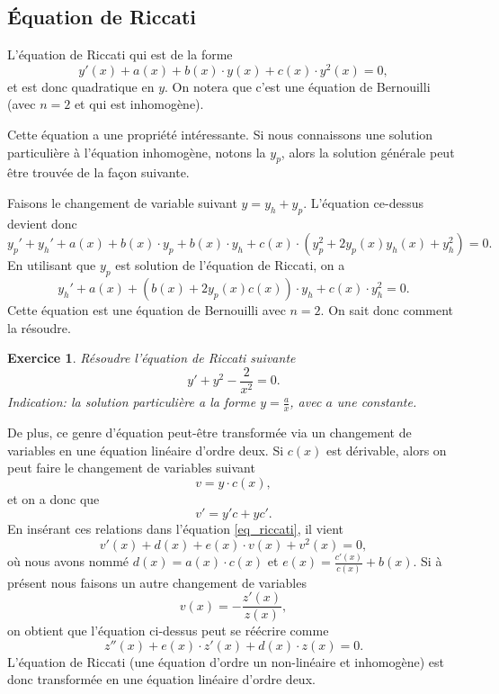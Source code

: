 \documentclass[a4paper,12pt]{book}
\renewcommand{\eqref}[1]{\ref{#1}}
\newtheorem*{exercice}{Exercice}
\begin{document}
\subsection{Équation de Riccati}

L'équation de Riccati qui est de la forme
\begin{equation}
 y'(x)+a(x)+b(x)\cdot y(x)+c(x)\cdot y^2(x)=0,\label{eq_riccati}
\end{equation}
et est donc quadratique en $y$. On notera que c'est une équation de Bernouilli (avec $n=2$ et qui est inhomogène).

Cette équation a une propriété intéressante. Si nous connaissons une solution particulière 
à l'équation inhomogène, notons la $y_p$, alors la solution générale peut être trouvée de la façon suivante.

Faisons le changement de variable suivant $y=y_h+y_p$. L'équation ce-dessus devient donc
\begin{equation}
 y_p'+y_h'+a(x)+b(x)\cdot y_p+b(x)\cdot y_h+c(x)\cdot (y_p^2+2y_p(x)y_h(x)+y_h^2)=0.
\end{equation}
En utilisant que $y_p$ est solution de l'équation de Riccati, on a
\begin{equation}
 y_h'+a(x)+(b(x)+2y_p(x)c(x))\cdot y_h+c(x)\cdot y_h^2=0.
\end{equation}
Cette équation est une équation de Bernouilli avec $n=2$. On sait donc comment la résoudre. 

\begin{exercice}
 Résoudre l'équation de Riccati suivante
 \begin{equation}
 y'+y^2-\frac{2}{x^2}=0.
 \end{equation}
Indication: la solution particulière a la forme $y=\frac{a}{x}$, avec $a$ une constante.
\end{exercice}


De plus, ce genre d'équation peut-être transformée via un changement de variables en une équation 
linéaire d'ordre deux. Si $c(x)$ est dérivable, alors on peut faire le changement de variables suivant
\begin{equation}
v=y\cdot c(x),
\end{equation}
et on a donc que 
\begin{equation}
v'=y' c+y c'.
\end{equation}
En insérant ces relations dans l'équation \eqref{eq_riccati}, il vient
\begin{equation}
 v'(x)+d(x)+e(x)\cdot v(x)+v^2(x)=0,\label{eq_riccati_2}
\end{equation}
où nous avons nommé $d(x)=a(x)\cdot c(x)$ et $e(x)=\frac{c'(x)}{c(x)}+b(x)$. Si à présent nous faisons
un autre changement de variables 
\begin{equation}
 v(x)=-\frac{z'(x)}{z(x)},
\end{equation}
on obtient que l'équation ci-dessus peut se réécrire comme
\begin{equation}
 z''(x)+e(x)\cdot z'(x)+d(x)\cdot z(x)=0.\label{eq_riccati_3}
\end{equation}
L'équation de Riccati (une équation d'ordre un non-linéaire et inhomogène) est donc transformée en une équation linéaire d'ordre deux.
\end{document}
